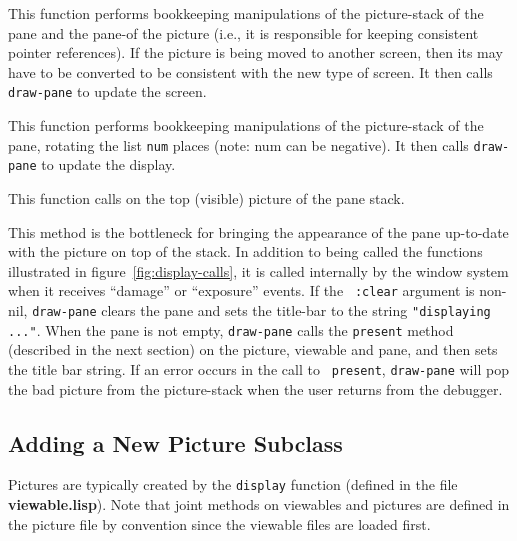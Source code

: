 \begin{description}
\item{}
This function performs bookkeeping manipulations of the picture-stack
of the pane and the pane-of the picture (i.e., it is responsible for
keeping consistent pointer references).  If the picture is being moved
to another screen, then its  may have to
be converted to be consistent with the new type of screen.  It then
calls {\tt draw-pane} to update the screen.

\item{}
This function performs bookkeeping manipulations of the picture-stack
of the pane, rotating the list {\tt num} places (note: num can be
negative).  It then calls {\tt draw-pane} to update the display.

\item{}
This function calls  on the top (visible) picture of the
pane stack.

\item{}
This method is the bottleneck for bringing the appearance of the pane
up-to-date with the picture on top of the stack.  In addition to being
called the functions illustrated in figure~\ref{fig:display-calls}, it
is called internally by the window system when it receives ``damage''
or ``exposure'' events.  If the {\tt
:clear} argument is non-nil, {\tt draw-pane} clears the pane and sets
the title-bar to the string {\tt "displaying ..."}.  When the pane is
not empty, {\tt draw-pane} calls the {\tt present} method (described
in the next section) on the picture, viewable and pane, and then sets
the title bar string.  If an error occurs in the call to {\tt
present}, {\tt draw-pane} will pop the bad picture from the
picture-stack when the user returns from the debugger.

\end{description}

\subsection{Adding a New Picture Subclass}
\label{sec:new-picture}

Pictures are typically created by the {\tt display} function
(defined in the file {\bf viewable.lisp}).  Note
that joint methods on viewables and pictures are defined in the
picture file by convention since the viewable files are loaded first.

